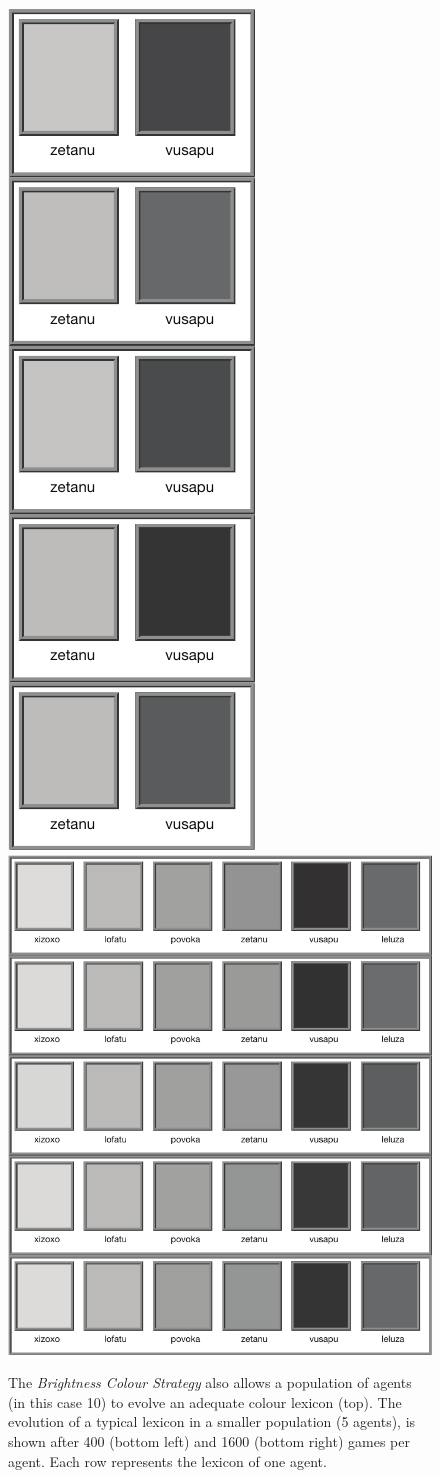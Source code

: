 \begin{figure}[p]
\centerline{
\includegraphics[height=0.5\textwidth]{chap12/figs/bw-1000.pdf} ~~~
\includegraphics[height=0.5\textwidth]{chap12/figs/bw-4000.pdf}}
\label{fig:brightness-dynamics}
\caption{{The {\itshape Brightness Colour Strategy} also allows a population of agents (in this case 10)
to evolve an adequate colour lexicon (top). The evolution of a typical lexicon in a smaller population (5 agents), is shown 
after 400 (bottom left) and 1600 (bottom right) games per agent. Each row represents
the lexicon of one agent.}}
\end{figure}

